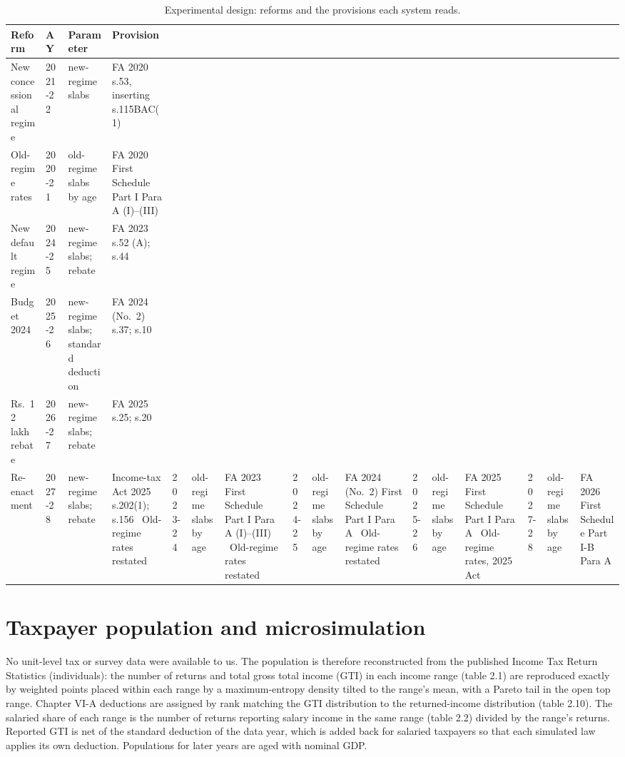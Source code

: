 \documentclass[sn-apa]{sn-jnl}
\begin{document}
\begin{table}[t]
\centering\small
\caption{Experimental design: reforms and the provisions each system reads.}
\label{tab:design}
\begin{tabular}{llll}
\toprule
Reform & AY & Parameter & Provision \\
\midrule
New concessional regime & 2021-22 & new-regime slabs & FA 2020 s.53, inserting s.115BAC(1) \\
Old-regime rates & 2020-21 & old-regime slabs by age & FA 2020 First Schedule Part I Para A (I)--(III) \\
New default regime & 2024-25 & new-regime slabs; rebate & FA 2023 s.52 (A); s.44 \\
Budget 2024 & 2025-26 & new-regime slabs; standard deduction & FA 2024 (No.~2) s.37; s.10 \\
Rs.~12 lakh rebate & 2026-27 & new-regime slabs; rebate & FA 2025 s.25; s.20 \\
Re-enactment & 2027-28 & new-regime slabs; rebate & Income-tax Act 2025 s.202(1); s.156 \
Old-regime rates restated & 2023-24 & old-regime slabs by age & FA 2023 First Schedule Part I Para A (I)--(III) \
Old-regime rates restated & 2024-25 & old-regime slabs by age & FA 2024 (No.~2) First Schedule Part I Para A \
Old-regime rates restated & 2025-26 & old-regime slabs by age & FA 2025 First Schedule Part I Para A \
Old-regime rates, 2025 Act & 2027-28 & old-regime slabs by age & FA 2026 First Schedule Part I-B Para A \\
\bottomrule
\end{tabular}
\end{table}

\section{Taxpayer population and microsimulation}\label{sec:population}

No unit-level tax or survey data were available to us. The population is
therefore reconstructed from the published Income Tax Return Statistics
(individuals): the number of returns and total gross total income (GTI) in
each income range (table 2.1) are reproduced exactly by weighted points
placed within each range by a maximum-entropy density tilted to the range's
mean, with a Pareto tail in the open top range. Chapter VI-A deductions are
assigned by rank matching the GTI distribution to the returned-income
distribution (table 2.10). The salaried share of each range is the number of
returns reporting salary income in the same range (table 2.2) divided by the
range's returns. Reported GTI is net of the standard deduction of the data
year, which is added back for salaried taxpayers so that each simulated law
applies its own deduction. Populations for later years are aged with nominal
GDP.
\end{document}
